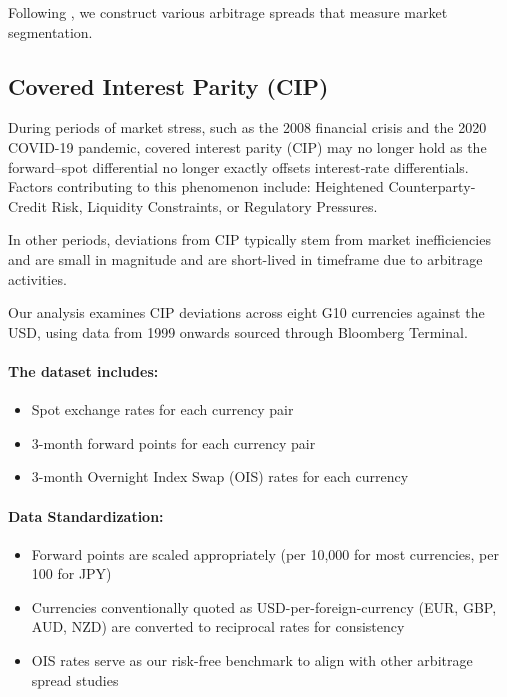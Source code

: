 \documentclass{article}
\begin{document}
Following \cite{Siriwardane2021}, we construct various arbitrage spreads that measure market segmentation.

\subsection{Covered Interest Parity (CIP)}
     

During periods of market stress, such as the 2008 financial crisis and the 2020 COVID-19
pandemic, covered interest parity (CIP) may no longer hold as the forward–spot differential 
no longer exactly offsets interest‐rate differentials. Factors contributing to this phenomenon include:
Heightened Counterparty‐Credit Risk, Liquidity Constraints, or Regulatory Pressures.

In other periods, deviations from CIP typically stem from market inefficiencies and are 
small in magnitude and are short-lived in timeframe due to arbitrage activities.

Our analysis examines CIP deviations across eight G10 currencies against the USD, 
using data from 1999 onwards sourced through Bloomberg Terminal.

\paragraph{The dataset includes:}
\begin{itemize}
    \item Spot exchange rates for each currency pair
    \item 3-month forward points for each currency pair
    \item 3-month Overnight Index Swap (OIS) rates for each currency
\end{itemize}

\paragraph{Data Standardization:}
\begin{itemize}
    \item Forward points are scaled appropriately (per 10,000 for most currencies, per 100 for JPY)
    \item Currencies conventionally quoted as USD-per-foreign-currency (EUR, GBP, AUD, NZD) are converted to reciprocal rates for consistency
    \item OIS rates serve as our risk-free benchmark to align with other arbitrage spread studies
\end{itemize}
\end{document}
